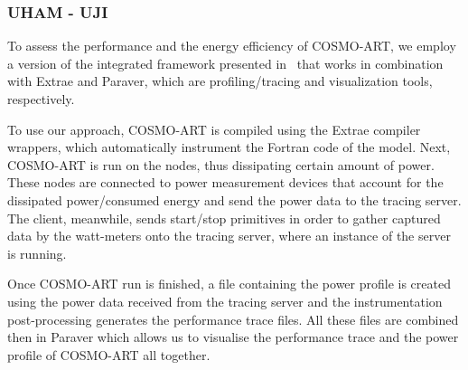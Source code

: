 \subsubsection{UHAM - UJI}
To assess the  performance and the energy efficiency  of COSMO-ART, we
employ   a    version   of   the    integrated   framework   presented
in~\cite{energy13} that works in  combination with Extrae and Paraver,
which are profiling/tracing and visualization tools, respectively.

To use our  approach, COSMO-ART is compiled using  the Extrae compiler
wrappers,  which  automatically instrument  the  Fortran  code of  the
model. Next, COSMO-ART  is run on the nodes,  thus dissipating certain
amount  of power.   These  nodes are  connected  to power  measurement
devices that account for the dissipated power/consumed energy and send
the power  data to the  tracing server.  The client,  meanwhile, sends
start/stop  primitives  in  order  to  gather  captured  data  by  the
watt-meters onto the  tracing server, where an instance  of the \pmlib
server is running.

Once COSMO-ART run is finished, a file containing the power profile is
created using the power data  received from the tracing server and the
instrumentation post-processing generates the performance trace files.
All  these files  are  combined then  in  Paraver which  allows us  to
visualise the performance trace and the power profile of COSMO-ART all
together.




